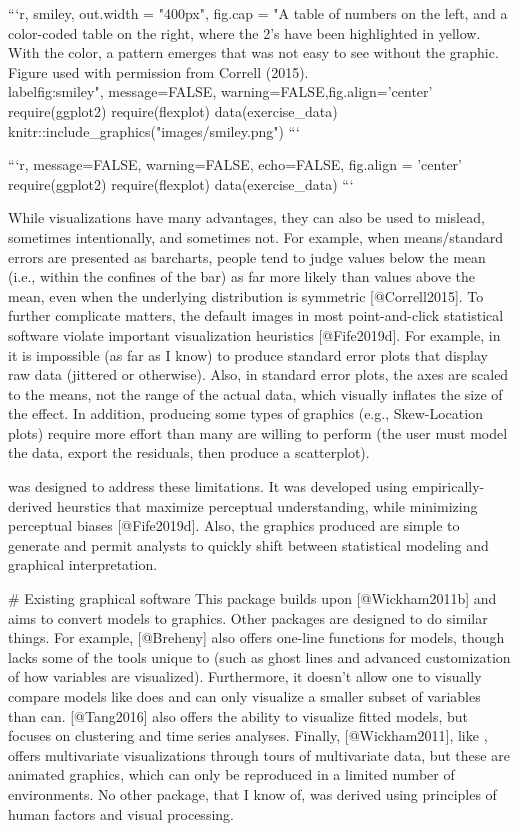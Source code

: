 ```{r, smiley, out.width = "400px", fig.cap = "A table of numbers on the left, and a color-coded table on the right, where the 2's have been highlighted in yellow. With the color, a pattern emerges that was not easy to see without the graphic. Figure used with permission from Correll (2015). \\label{fig:smiley}", message=FALSE, warning=FALSE,fig.align='center'}
require(ggplot2)
require(flexplot)
data(exercise_data)
knitr::include_graphics("images/smiley.png")
```


```{r, message=FALSE, warning=FALSE, echo=FALSE, fig.align = 'center'}
require(ggplot2)
require(flexplot)
data(exercise_data)
```



While visualizations have many advantages, they can also be used to mislead, sometimes intentionally, and sometimes not. For example, when means/standard errors are presented as barcharts, people tend to judge values below the mean (i.e., within the confines of the bar) as far more likely than values above the mean, even when the underlying distribution is symmetric [@Correll2015]. To further complicate matters, the default images in most point-and-click statistical software violate important visualization heuristics [@Fife2019d]. For example, in  it is impossible (as far as I know) to produce standard error plots that display raw data (jittered or otherwise). Also, in standard error plots, the axes are scaled to the means, not the range of the actual data, which visually inflates the size of the effect. In addition, producing some types of graphics (e.g., Skew-Location plots) require more effort than many are willing to perform (the user must model the data, export the residuals, then produce a scatterplot).

 was designed to address these limitations. It was developed using empirically-derived heurstics that maximize perceptual understanding, while minimizing perceptual biases [@Fife2019d]. Also, the graphics produced are simple to generate and permit analysts to quickly shift between statistical modeling and graphical interpretation. 


# Existing graphical software
This package builds upon  [@Wickham2011b] and aims to convert  models to graphics. Other packages are designed to do similar things. For example,  [@Breheny]  also offers one-line functions for models, though lacks some of the tools unique to  (such as ghost lines and advanced customization of how variables are visualized). Furthermore, it doesn't allow one to visually compare models like  does and  can only visualize a smaller subset of variables than  can.  [@Tang2016] also offers the ability to visualize fitted models, but focuses on clustering and time series analyses. Finally,  [@Wickham2011], like , offers multivariate visualizations through tours of multivariate data, but these are animated graphics, which can only be reproduced in a limited number of environments. No other package, that I know of, was derived using principles of human factors and visual processing. 



